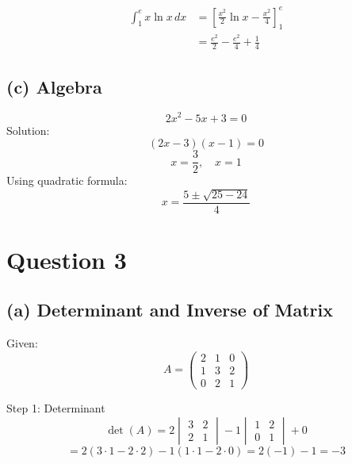 \documentclass[11pt]{article}
\begin{document}
\begin{align*}
    \int_1^e x \ln x \, dx &= \left[ \frac{x^2}{2} \ln x - \frac{x^2}{4} \right]_1^e \\
    &= \frac{e^2}{2} - \frac{e^2}{4} + \frac{1}{4}
\end{align*}

\begin{center}
\end{center}

\subsection*{(c) Algebra}

\[2x^2 - 5x + 3 = 0\]
Solution:
\[(2x - 3)(x - 1) = 0\]
\[x = \frac{3}{2}, \quad x = 1\]
Using quadratic formula:
\[x = \frac{5 \pm \sqrt{25 - 24}}{4}\]

\begin{center}
\end{center}

\newpage
\section*{Question 3}
\subsection*{(a) Determinant and Inverse of Matrix}
Given:
\[A = \begin{pmatrix} 2 & 1 & 0 \\ 1 & 3 & 2 \\ 0 & 2 & 1 \end{pmatrix}\]

Step 1: Determinant
\[\det(A) = 2 \begin{vmatrix} 3 & 2 \\ 2 & 1 \end{vmatrix} - 1 \begin{vmatrix} 1 & 2 \\ 0 & 1 \end{vmatrix} + 0\]
\[= 2(3 \cdot 1 - 2 \cdot 2) - 1(1 \cdot 1 - 2 \cdot 0) = 2(-1) - 1 = -3\]

\begin{center}
\end{center}
\end{document}
